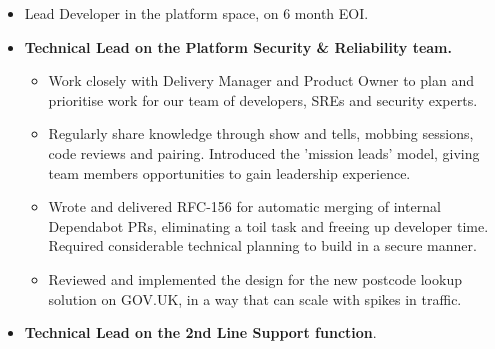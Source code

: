 \documentclass[10pt,a4paper,ragged2e,withhyper]{altacv}
\begin{document}
\begin{paracol}{2}

\def\nestedlistspacer{0.1cm}




\begin{itemize}
    \item Lead Developer in the platform space, on 6 month EOI.
\end{itemize}

\divider


\begin{itemize}
    \item \textbf{Technical Lead on the Platform Security \& Reliability team.}

    \vspace{\nestedlistspacer}
    \begin{itemize}[label=$\triangleright$]
        \item Work closely with Delivery Manager and Product Owner to plan and prioritise work for our team of developers, SREs and security experts.
        \item Regularly share knowledge through show and tells, mobbing sessions, code reviews and pairing. Introduced the 'mission leads' model, giving team members opportunities to gain leadership experience.
        \item Wrote and delivered RFC-156 for automatic merging of internal Dependabot PRs, eliminating a toil task and freeing up developer time. Required considerable technical planning to build in a secure manner.
        \item Reviewed and implemented the design for the new postcode lookup solution on GOV.UK, in a way that can scale with spikes in traffic.
    \end{itemize}

    \item \textbf{Technical Lead on the 2nd Line Support function}.


\end{itemize}
\end{paracol}
\end{document}
